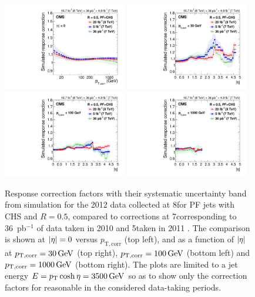 \documentclass[11pt,twoside,a4paper,cmspaper,final,collab]{cms-tdr}
\begin{document}
\begin{figure}[htbp!]
\centering
\includegraphics[width=0.48\textwidth]{Figure_014-a.pdf}
\includegraphics[width=0.48\textwidth]{Figure_014-b.pdf}
\includegraphics[width=0.48\textwidth]{Figure_014-c.pdf}
\includegraphics[width=0.48\textwidth]{Figure_014-d.pdf}
\caption{\label{fig:l2l3}
Response correction factors with their systematic uncertainty band from simulation for the 2012 data collected at 8\TeV for PF jets with CHS and $R=0.5$, compared to corrections at 7\TeV corresponding to 36~pb$^{-1}$ of data taken in 2010 \cite{JEC_JINST} and 5\fbinv taken in 2011 \cite{CMS-DP-2012-006}. The comparison is shown at $\lvert \eta \rvert=0$ versus $p_\mathrm{T, corr}$ (top left), and as a function of $\lvert \eta \rvert$ at $p_\mathrm{T, corr}=30\,\text{Ge\hspace{-.08em}V}$ (top right), $p_\mathrm{T, corr}=100\,\text{Ge\hspace{-.08em}V}$ (bottom left) and $p_\mathrm{T, corr}=1000\,\text{Ge\hspace{-.08em}V}$ (bottom right). The plots are limited to a jet energy $E=p_{\mathrm{T}}\cosh\eta=3500\,\text{Ge\hspace{-.08em}V}$ so as to show only the correction factors for reasonable \pt in the considered data-taking periods.}
\end{figure}
\end{document}
